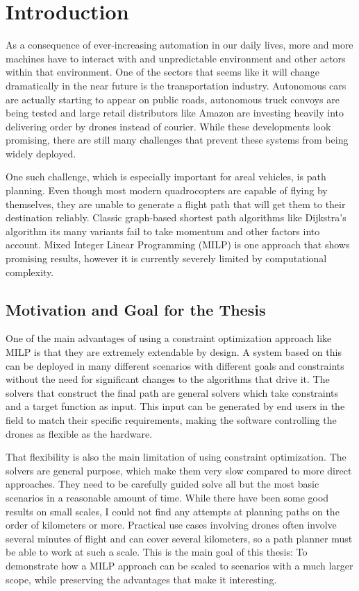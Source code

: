 \section{Introduction}
As a consequence of ever-increasing automation in our daily lives, more and more machines have to interact with and unpredictable environment and other actors within that environment. One of the sectors that seems like it will change dramatically in the near future is the transportation industry. Autonomous cars are actually starting to appear on public roads, autonomous truck convoys are being tested and large retail distributors like Amazon are investing heavily into delivering order by drones instead of courier. While these developments look promising, there are still many challenges that prevent these systems from being widely deployed.
\par
One such challenge, which is especially important for areal vehicles, is path planning. Even though most modern quadrocopters are capable of flying by themselves, they are unable to generate a flight path that will get them to their destination reliably. Classic graph-based shortest path algorithms like Dijkstra's algorithm its many variants fail to take momentum and other factors into account. Mixed Integer Linear Programming (MILP) is one approach that shows promising results, however it is currently severely limited by computational complexity.



\newpage
\subsection{Motivation and Goal for the Thesis}
One of the main advantages of using a constraint optimization approach like MILP is that they are extremely extendable by design. A system based on this can be deployed in many different scenarios with different goals and constraints without the need for significant changes to the algorithms that drive it. The solvers that construct the final path are general solvers which take constraints and a target function as input. This input can be generated by end users in the field to match their specific requirements, making the software controlling the drones as flexible as the hardware.
\par
That flexibility is also the main limitation of using constraint optimization. The solvers are general purpose, which make them very slow compared to more direct approaches. They need to be carefully guided solve all but the most basic scenarios in a reasonable amount of time. While there have been some good results on small scales, I could not find any attempts at planning paths on the order of kilometers or more. Practical use cases involving drones often involve several minutes of flight and can cover several kilometers, so a path planner must be able to work at such a scale. This is the main goal of this thesis: To demonstrate how a MILP approach can be scaled to scenarios with a much larger scope, while preserving the advantages that make it interesting.
